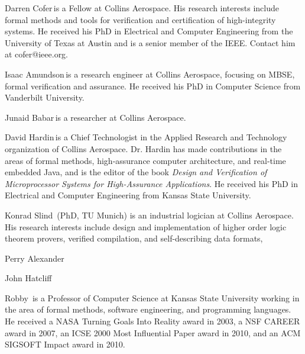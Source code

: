 \begin{IEEEbiography}{Darren Cofer}{\,}is a Fellow at Collins Aerospace. His research interests include formal methods and tools for verification and certification of high-integrity systems. He received his PhD in Electrical and Computer Engineering from the University of Texas at Austin and is a senior member of the IEEE. Contact him at cofer@ieee.org.
\end{IEEEbiography}

\begin{IEEEbiography}{Isaac Amundson}{\,}is a research engineer at Collins Aerospace, focusing on MBSE, formal verification and assurance.  He received his PhD in Computer Science from Vanderbilt University.
\end{IEEEbiography}

\begin{IEEEbiography}{Junaid Babar}{\,}is a researcher at Collins Aerospace.
\end{IEEEbiography}

\begin{IEEEbiography}{David Hardin}{\,}is a Chief Technologist in the Applied Research and Technology organization of Collins Aerospace.  Dr. Hardin has made contributions in the areas of formal methods, high-assurance computer architecture, and real-time embedded Java, and is the editor of the book \emph{Design and Verification of Microprocessor Systems for High-Assurance Applications}.  He received his PhD in Electrical and Computer Engineering from Kansas State University.
\end{IEEEbiography}

\begin{IEEEbiography}{Konrad Slind}{\,} (PhD, TU Munich) is an industrial logician at Collins Aerospace.
  His research interests include design and implementation of higher
  order logic theorem provers, verified compilation, and
  self-describing data formats,
\end{IEEEbiography}

\begin{IEEEbiography}{Perry Alexander}{\,}
\end{IEEEbiography}

\begin{IEEEbiography}{John Hatcliff}{\,}
\end{IEEEbiography}

\begin{IEEEbiography}{Robby}{\,}
is a Professor of Computer Science at Kansas State University working
in the area of formal methods, software engineering, and programming
languages.
He received a NASA Turning Goals Into Reality award in 2003,
a NSF CAREER award in 2007, an ICSE 2000 Most Influential Paper award in 2010,
and an ACM SIGSOFT Impact award in 2010.
\end{IEEEbiography}

